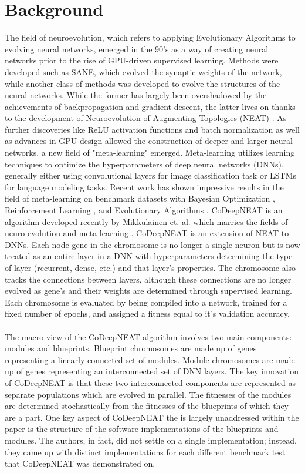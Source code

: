 \documentclass[11pt]{article}
\begin{document}
\section{Background}
	The field of neuroevolution, which refers to applying Evolutionary Algorithms to evolving neural networks, emerged in the 90's as a way of creating neural networks prior to the rise of GPU-driven supervised learning. Methods were developed such as SANE, \cite{hsane} which evolved the synaptic weights of the network, while another class of methods was developed to evolve the structures of the neural networks. While the former has largely been overshadowed by the achievements of backpropagation and gradient descent, the latter lives on thanks to the development of Neuroevolution of Augmenting Topologies (NEAT) \cite{neat}. As further discoveries like ReLU activation functions and batch normalization as well as advances in GPU design allowed the construction of deeper and larger neural networks, a new field of "meta-learning" emerged. Meta-learning utilizes learning techniques to optimize the hyperparameters of deep neural networks (DNNs), generally either using convolutional layers for image classification task or LSTMs for language modeling tasks. Recent work has shown impressive results in the field of meta-learning on benchmark datasets with Bayesian Optimization \cite{bayes}, Reinforcement Learning \cite{zoph}, and Evolutionary Algorithms \cite{googlebrain}.
    CoDeepNEAT is an algorithm developed recently by Mikkulainen et. al. which marries the fields of neuro-evolution and meta-learning \cite{codeepneat}. CoDeepNEAT is an extension of NEAT to DNNs. Each node gene in the chromosome is no longer a single neuron but is now treated as an entire layer in a DNN with hyperparameters determining the type of layer (recurrent, dense, etc.) and that layer's properties. The chromosome also tracks the connections between layers, although these connections are no longer evolved as gene's and their weights are determined through supervised learning. Each chromosome is evaluated by being compiled into a network, trained for a fixed number of epochs, and assigned a fitness equal to it's validation accuracy. \\
    \\The macro-view of the CoDeepNEAT algorithm involves two main components: modules and blueprints. Blueprint chromosomes are made up of genes representing a linearly connected set of modules. Module chromosomes are made up of genes representing an interconnected set of DNN layers. The key innovation of CoDeepNEAT is that these two interconnected components are represented as separate populations which are evolved in parallel. The fitnesses of the modules are determined stochastically from the fitnesses of the blueprints of which they are a part. One key aspect of CoDeepNEAT the is largely unaddressed within the paper is the structure of the software implementations of the blueprints and modules. The authors, in fact, did not settle on a single implementation; instead, they came up with distinct implementations for each different benchmark test that CoDeepNEAT was demonstrated on.\\
\end{document}
